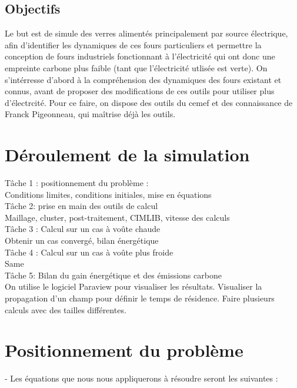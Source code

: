 \documentclass[12pt, a4paper, french, BCOR = 0pt, DIV = 10]{scrartcl}
\begin{document}
    \subsection{Objectifs}
    Le but est de simule des verres alimentés principalement par source électrique, afin d'identifier les dynamiques de ces fours particuliers et permettre la conception de fours industriels fonctionnant à l'électricité qui ont donc une empreinte carbone plus faible (tant que l'électricité utlisée est verte). On s'intérresse d'abord à la compréhension des dynamiques des fours existant et connus, avant de proposer des modifications de ces outils pour utiliser plus d'électrcité. Pour ce faire, on dispose des outils du cemef et des connaissance de Franck Pigeonneau, qui maîtrise déjà les outils.
    
    
    
    \section{ Déroulement de la simulation}
    Tâche 1 : positionnement du problème : \\
    Conditions limites, conditions initiales, mise en équations \\[0.3 cm]
    Tâche 2: prise en main des outils de calcul\\
    Maillage, cluster, post-traitement, CIMLIB, vitesse des calculs \\ [0.3 cm]
    
    Tâche 3 : Calcul sur un cas à voûte chaude\\ 
    Obtenir un cas convergé, bilan énergétique \\ [0.3 cm]
    
    Tâche 4 : Calcul sur un cas à voûte plus froide \\ 
    Same\\ [0.3 cm]
    
    Tâche 5: Bilan du gain énergétique et des émissions carbone \\ [0.5cm]
    
    
    On  utilise le logiciel Paraview pour visualiser les résultats.
    Visualiser la propagation d'un champ pour définir le temps de résidence.
    Faire plusieurs calculs avec des tailles différentes.
    
    \section{Positionnement du problème}
    - Les équations que nous nous appliquerons à résoudre seront les suivantes : \\
\end{document}

